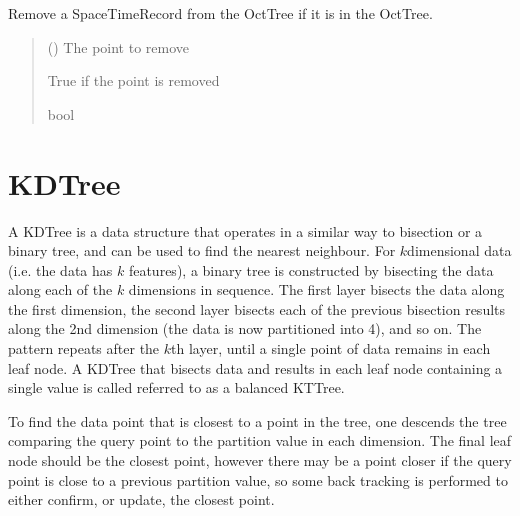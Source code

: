 \documentclass[letterpaper,10pt,english]{sphinxmanual}
\begin{document}
\begin{fulllineitems}
\begin{fulllineitems}
\label{\detokenize{octtree:geotrees.octtree.OctTree.remove}}
\pysigstartsignatures
\pysiglinewithargsret
{}
{}
{}
\pysigstopsignatures
\sphinxAtStartPar
Remove a SpaceTimeRecord from the OctTree if it is in the OctTree.
\begin{quote}\begin{description}
\sphinxAtStartPar
{} ({\hyperref[\detokenize{record:geotrees.record.SpaceTimeRecord}]{}}) \textendash{} The point to remove

\sphinxAtStartPar
True if the point is removed

\sphinxAtStartPar
bool

\end{description}\end{quote}

\end{fulllineitems}


\end{fulllineitems}


\sphinxstepscope


\chapter{K\sphinxhyphen{}D\sphinxhyphen{}Tree}
\label{\detokenize{kdtree:k-d-tree}}\label{\detokenize{kdtree::doc}}
\sphinxAtStartPar
A K\sphinxhyphen{}D\sphinxhyphen{}Tree is a data structure that operates in a similar way to bisection or a binary tree, and can be used to find the
nearest neighbour. For \(k\)\sphinxhyphen{}dimensional data (i.e. the data has \(k\) features), a binary tree is constructed
by bisecting the data along each of the \(k\) dimensions in sequence. The first layer bisects the data along the
first dimension, the second layer bisects each of the previous bisection results along the 2nd dimension (the data is
now partitioned into 4), and so on. The pattern repeats after the \(k\)\sphinxhyphen{}th layer, until a single point of data
remains in each leaf node. A K\sphinxhyphen{}D\sphinxhyphen{}Tree that bisects data and results in each leaf node containing a single value is
called referred to as a balanced K\sphinxhyphen{}T\sphinxhyphen{}Tree.

\sphinxAtStartPar
To find the data point that is closest to a point in the tree, one descends the tree comparing the query point to the
partition value in each dimension. The final leaf node should be the closest point, however there may be a point closer
if the query point is close to a previous partition value, so some back tracking is performed to either confirm, or
update, the closest point.
\end{document}
